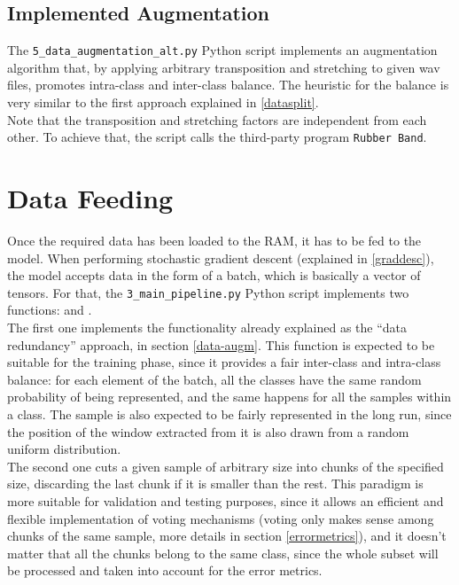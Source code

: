   \subsection{Implemented Augmentation}

  The \texttt{5\_data\_augmentation\_alt.py} Python script implements an augmentation algorithm that, by applying arbitrary transposition and stretching to given wav files, promotes intra-class and inter-class balance. The heuristic for the balance is very similar to the first approach explained in \ref{datasplit}.\\

  Note that the transposition and stretching factors are independent from each other. To achieve that, the script calls the third-party program \texttt{Rubber Band}\cite{rubberband}.


  \section{Data Feeding}\label{data_feeding}

  Once the required data has been loaded to the RAM, it has to be fed to the model. When performing stochastic gradient descent (explained in \ref{graddesc}), the model accepts data in the form of a batch, which is basically a vector of tensors. For that, the \texttt{3\_main\_pipeline.py} Python script implements two functions:  and .\\

  The first one implements the functionality already explained as the ``data redundancy'' approach, in section \ref{data-augm}. This function is expected to be suitable for the training phase, since it provides a fair inter-class and intra-class balance:  for each element of the batch, all the classes have the same random probability of being represented, and the same happens for all the samples within a class. The sample is also expected to be fairly represented in the long run, since the position of the window extracted from it is also drawn from a random uniform distribution.\\

  The second one cuts a given sample of arbitrary size into chunks of the specified size, discarding the last chunk if it is smaller than the rest. This paradigm is more suitable for validation and testing purposes, since it allows an efficient and flexible implementation of voting mechanisms (voting only makes sense among chunks of the same sample, more details in section \ref{errormetrics}), and it doesn't matter that all the chunks belong to the same class, since the whole subset will be processed and taken into account for the error metrics.



